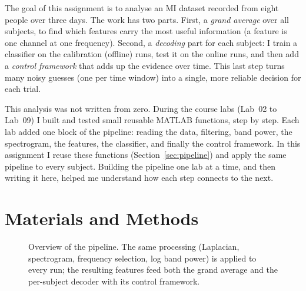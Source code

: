 \documentclass[10pt,twocolumn,a4paper]{article}
\begin{document}
The goal of this assignment is to analyse an MI dataset recorded from eight
people over three days. The work has two parts. First, a \emph{grand average}
over all subjects, to find which features carry the most useful information (a
feature is one channel at one frequency). Second, a \emph{decoding} part for
each subject: I train a classifier on the calibration (offline) runs, test it
on the online runs, and then add a \emph{control framework} that adds up the
evidence over time. This last step turns many noisy guesses (one per time
window) into a single, more reliable decision for each trial.

This analysis was not written from zero. During the course labs (Lab~02 to
Lab~09) I built and tested small reusable MATLAB functions, step by step. Each
lab added one block of the pipeline: reading the data, filtering, band power,
the spectrogram, the features, the classifier, and finally the control
framework. In this assignment I reuse these functions
(Section~\ref{sec:pipeline}) and apply the same pipeline to every subject.
Building the pipeline one lab at a time, and then writing it here, helped me
understand how each step connects to the next.

\section{Materials and Methods}

\begin{figure}[t]
\centering
{}
\caption{Overview of the pipeline. The same processing (Laplacian, spectrogram,
frequency selection, log band power) is applied to every run; the resulting
features feed both the grand average and the per-subject decoder with its
control framework.}
\label{fig:pipeline}
\end{figure}
\end{document}
